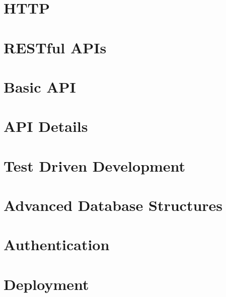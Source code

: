\documentclass[b5paper,openany]{book}
\begin{document}
\tp


\tableofcontents



\chapter{HTTP}


\chapter{RESTful APIs}


\chapter{Basic API}


\chapter{API Details}


\chapter{Test Driven Development}


\chapter{Advanced Database Structures}


\chapter{Authentication}


\chapter{Deployment}






\end{document}
